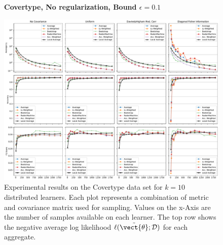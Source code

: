 \begin{landscape}
    \begin{figure}
        \centering
        \textbf{Covertype, No regularization, Bound $\epsilon=0.1$}\par\medskip
        \includegraphics[height=\dimexpr \textheight - 4\baselineskip\relax]{kapitel/figures/covertype_None_0.1.pdf}
        \caption[Covertype plots without regularization and $\epsilon=0.1$]{Experimental results on the Covertype data set for $k=10$ distributed learners. Each plot represents a combination of metric and covariance matrix used for sampling. Values on the x-Axis are the number of samples available on each learner. The top row shows the negative average log likelihood $\ell(\tilde{\vect{\theta}}; \mathcal{D})$ for each aggregate.}
        \label{fig:analysis7}
    \end{figure}
    \end{landscape}
